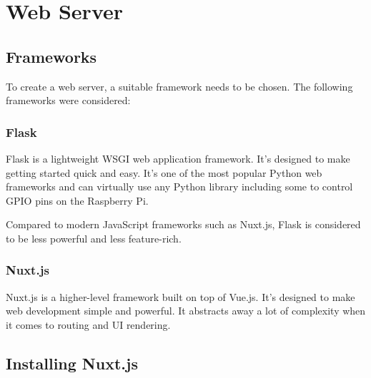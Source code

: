\section{Web Server} \label{sec:webServer}
        \subsection{Frameworks}
        To create a web server, a suitable framework needs
        to be chosen. The following frameworks were considered:

            \subsubsection{Flask}
            Flask is a lightweight WSGI web application framework.
            It's designed to make getting started quick and easy. 
            It's one of the most popular Python web frameworks and
            can virtually use any Python library including some
            to control GPIO pins on the Raspberry Pi.

            Compared to modern JavaScript frameworks such as Nuxt.js, 
            Flask is considered to be less powerful and less 
            feature-rich.

            \subsubsection{Nuxt.js}
            Nuxt.js is a higher-level framework built on top of Vue.js.
            It's designed to make web development simple and powerful.
            It abstracts away a lot of complexity when it comes to 
            routing and UI rendering.
            
        \subsection{Installing Nuxt.js}